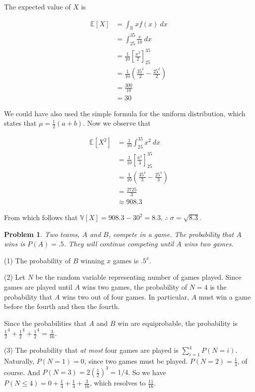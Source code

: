 \documentclass[a4paper, 12pt]{article}
\newtheorem{problem}{Problem}
\newtheorem{problem}{Problem}
\begin{document}
The expected value of $X$ is 

\begin{align*}
    \mathbb{E}\left[ X \right] &= \int_{\mathbb{R}} x f(x) ~ dx \\ 
                               &= \int_{25}^{35} \frac{x}{10} ~ dx \\ 
                               &= \frac{1}{10} \left[ \frac{x^2}{2} \right]_{25}^{35}  \\ 
                               &=\frac{1}{10}\left( \frac{35^2}{2} - \frac{25^2}{2} \right)  \\ 
                               &= \frac{300}{10} \\ 
                               &= 30
\end{align*}

We could have also used the simple formula for the uniform distribution, which
states that $\mu = \frac{1}{2}(a+b)$. Now we observe that 

\begin{align*}
    \mathbb{E}\left[ X^2 \right] &= \frac{1}{10} \int_{25}^{35}x^2 ~ dx \\ 
                               &= \frac{1}{10} \left[ \frac{x^3}{3} \right]_{25}^{35}  \\ 
                               &=\frac{1}{10}\left( \frac{35^3}{3} - \frac{25^3}{3} \right)  \\ 
                               &= \frac{2725}{3} \\ 
                               &\approx 908.3
\end{align*}

From which follows that $\mathbb{V}\left[ X \right] = 908.3 - 30^2 = 8.3$. $\therefore ~ \sigma = \sqrt{8.3} $.


\pagebreak 

\begin{problem}
    Two teams, $A$ and $ B$, compete in a game. The probability that 
    $A$ wins is $P(A) = .5$. They will continue competing until 
    $A$ wins two games.
\end{problem}

(1) The probability of $B$ winning $x$ games is $.5^x$. 

(2) Let $N$ be the random variable representing number of games played. Since
games are played until $A$ wins two games, the probability of $N = 4$ is the
probability that $A$ wins two out of four games. In particular, $A$ must win a
game before the fourth and then the fourth. 

Since the probabilities that $A$ and $B$ win are equiprobable, the probability
is $\frac{1}{2}^{4} + \frac{1}{2}^4 + \frac{1}{2}^4 = \frac{3}{16}$.

(3) The probability that \textit{at most} four games are played is
$\sum_{i=1}^{4} P(N = i)$. Naturally, $P(N=1) = 0$, since two games must be
played. $P(N = 2) = \frac{1}{4}$, of course. And $P(N = 3) = 2 (\frac{1}{2})^3
= 1/4$. So we have $P(N \leq 4) = 0 + \frac{1}{4} + \frac{1}{4} +
\frac{3}{16}$, which resolves to $\frac{11}{16}$.
\end{document}
